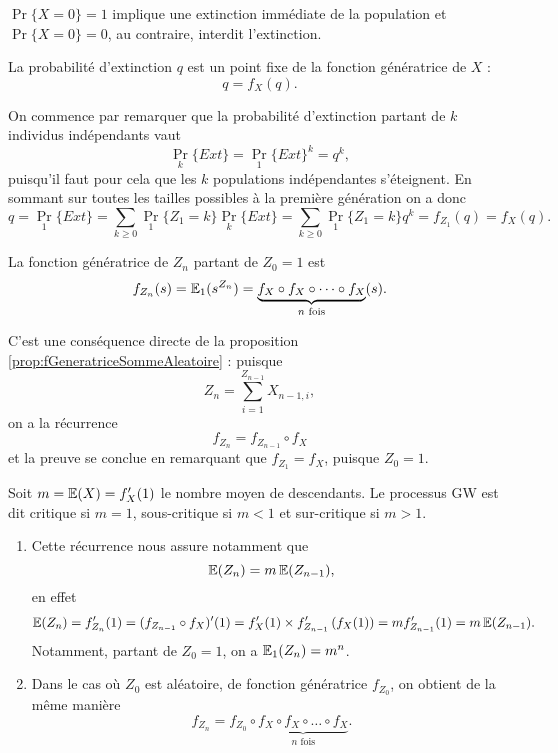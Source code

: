 \remark
$\Pr\{X = 0\} = 1$ implique une extinction immédiate de la population et $\Pr\{X = 0\} = 0$, au contraire, interdit l'extinction.

\begin{proposition}
  La probabilité d'extinction $q$ est un point fixe de la fonction génératrice de $X$ :
  $$
  q = f_X(q).
  $$
\end{proposition}

\proof
On commence par remarquer que la probabilité d'extinction partant de $k$ individus indépendants vaut
$$
\Pr_k\{Ext\} = \Pr_1\{Ext\}^k = q^k,
$$
puisqu'il faut pour cela que les $k$ populations indépendantes s'éteignent. En sommant sur toutes les tailles possibles à la première génération on a donc
$$
q 
= \Pr_1\{Ext\} 
= \sum_{k \geq 0} \Pr_1\{Z_1 = k\} \Pr_k\{Ext\}
= \sum_{k \geq 0} \Pr_1\{Z_1 = k\} q^k
= f_{Z_1}(q)
= f_X(q).
$$

\begin{proposition} \label{prop:fonctionGeneratriceZn}
  La fonction génératrice de $Z_n$ partant de $Z_0 = 1$ est
  $$
  f_{Z_n}(s) = \operatorname{\mathbb{E}}_1(s^{Z_n}) = \underset{n \text{ fois}}{\underbrace{f_X \circ f_X \circ \dots \circ f_X}}(s).
  $$
\end{proposition}

\proof 
C'est une conséquence directe de la proposition \ref{prop:fGeneratriceSommeAleatoire} : puisque
$$
Z_n = \sum_{i=1}^{Z_{n-1}} X_{n-1, i},
$$
on a la récurrence 
$$
f_{Z_n} = f_{Z_{n-1}} \circ f_X
$$
et la preuve se conclue en remarquant que $f_{Z_1} = f_X$, puisque $Z_0 = 1$.
\eproof

\begin{definition}
  Soit $m = \operatorname{\mathbb{E}}(X) = f'_X(1)$ le nombre moyen de descendants. Le processus GW est dit critique si $m=1$, sous-critique si $m < 1$ et sur-critique si $m > 1$.
\end{definition}

\remarks
\begin{enumerate}
  \item Cette récurrence nous assure notamment que
  $$
  \operatorname{\mathbb{E}}(Z_n) = m \operatorname{\mathbb{E}}(Z_{n-1}),
  $$
  en effet
  \begin{align*}
    \operatorname{\mathbb{E}}(Z_n) 
    = f'_{Z_n}(1) = (f_{Z_{n-1}} \circ f_X)'(1) 
    = f'_X(1) \times f'_{Z_{n-1}}\left(f_X(1)\right) 
    = m f'_{Z_{n-1}}(1) = m \operatorname{\mathbb{E}}(Z_{n-1}).
  \end{align*}
  Notamment, partant de $Z_0 = 1$, on a $\operatorname{\mathbb{E}}_1(Z_n) = m^n$.
  \item Dans le cas où $Z_0$ est aléatoire, de fonction génératrice $f_{Z_0}$, on obtient de la même manière
  $$
  f_{Z_n} =  f_{Z_0} \circ \underset{n \text{ fois}}{\underbrace{f_X \circ f_X \circ \dots \circ f_X}}.
  $$
\end{enumerate}

